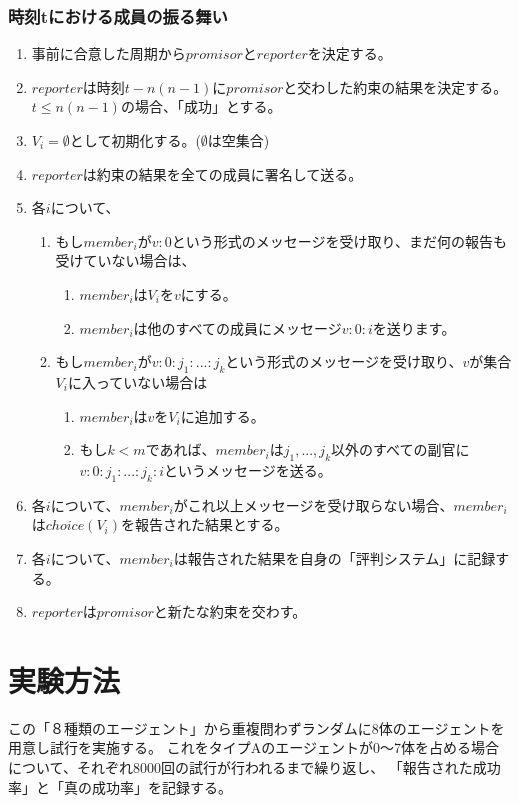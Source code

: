\subsubsection{時刻tにおける成員の振る舞い}
\label{behaiverAtTimeT}
\begin{enumerate}
  \item 事前に合意した周期から$promisor$と$reporter$を決定する。
  \item $reporter$は時刻$t-n(n-1)$に$promisor$と交わした約束の結果を決定する。$t \leq n(n-1)$の場合、「成功」とする。
  \item $V_i=\emptyset$として初期化する。($\emptyset$は空集合)
  \item $reporter$は約束の結果を全ての成員に署名して送る。
  \item 各$i$について、 
  \begin{enumerate}
    \item もし$member_i$が$v:0$という形式のメッセージを受け取り、まだ何の報告も受けていない場合は、
    \begin{enumerate}
      \item $member_i$は$ V_i$を${v}$にする。 
      \item $member_i$は他のすべての成員にメッセージ$v:0:i$を送ります。
    \end{enumerate}
    \item もし$member_i$が$v:0:j_1:...:j_k$という形式のメッセージを受け取り、$v$が集合$V_i$に入っていない場合は
    \begin{enumerate}
      \item $member_i$は$v$を$V_i$に追加する。
      \item もし$k<m$であれば、$member_i$は$j_1, ..., j_k$以外のすべての副官に$v:0:j_1:...:j_k:i$というメッセージを送る。
    \end{enumerate}
  \end{enumerate}
  \item 各$i$について、$member_i$がこれ以上メッセージを受け取らない場合、$member_i$は$choice(V_i)$を報告された結果とする。
  \item 各$i$について、$member_i$は報告された結果を自身の「評判システム」に記録する。
  \item $reporter$は$promisor$と新たな約束を交わす。
\end{enumerate}

\section{実験方法}
  この「８種類のエージェント」から重複問わずランダムに8体のエージェントを用意し試行を実施する。
  これをタイプAのエージェントが0〜7体を占める場合について、それぞれ8000回の試行が行われるまで繰り返し、
  「報告された成功率」と「真の成功率」を記録する。


